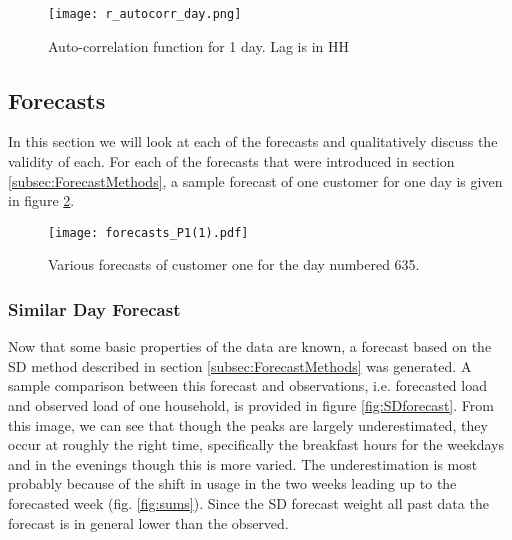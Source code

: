 \documentclass[a4paper]{article}
\begin{document}
\begin{figure}
\centering
\texttt{[image: r\_autocorr\_day.png]}
\caption{Auto-correlation function for 1 day. Lag is in HH}
\label{fig:acf_day} 
\end{figure}

\clearpage


\subsection{Forecasts}\label{subsec:forecasts}
In this section we will look at each of the forecasts and qualitatively discuss the validity of each. For each of the forecasts that were introduced in section \ref{subsec:ForecastMethods}, a sample forecast of one customer for one day is given in figure \ref{fig:forecasts_P1}.

\begin{figure}
\centering
\texttt{[image: forecasts\_P1(1).pdf]}
\caption{Various forecasts of customer one for the day numbered 635.}
\label{fig:forecasts_P1} 
\end{figure}

\subsubsection{Similar Day Forecast} \label{subsubsec:SD_res}
Now that some basic properties of the data are known, a forecast based on the SD method described in section \ref{subsec:ForecastMethods} was generated. A sample comparison between this forecast and observations, i.e. forecasted load and observed load of one household, is provided in figure \ref{fig:SDforecast}. From this image, we can see that though the peaks are largely underestimated, they occur at roughly the right time, specifically the breakfast hours for the weekdays and in the evenings though this is more varied. The underestimation is most probably because of the shift in usage in the two weeks leading up to the forecasted week (fig. \ref{fig:sums}). Since the SD forecast weight all past data the forecast is in general lower than the observed.
\end{document}
